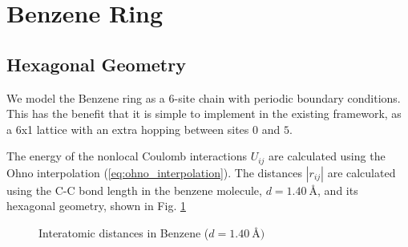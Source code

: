 \section{Benzene Ring}






\subsection{Hexagonal Geometry}

We model the Benzene ring as a 6-site chain with periodic boundary conditions. This has the benefit that it is simple to implement in the existing framework, as a 6x1 lattice with an extra hopping between sites $0$ and $5$. 


\medskip

The energy of the nonlocal Coulomb interactions $U_{ij}$ are calculated using the Ohno interpolation (\ref{eq:ohno_interpolation}). The distances $|r_{ij}|$ are calculated using the C-C bond length in the benzene molecule, $d=\SI{1.40}{\angstrom}$, and its hexagonal geometry, shown in Fig. \ref{fig:benzene_distances}

\begin{figure}[!hbt]
    \centering
    \caption{Interatomic distances in Benzene ($d=\SI{1.40}{\angstrom})$}
    \label{fig:benzene_distances}
\end{figure}

